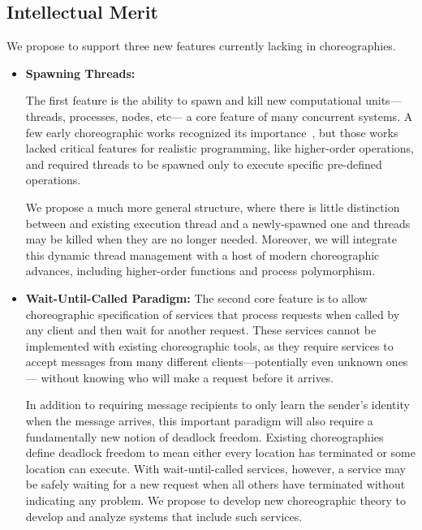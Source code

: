\subsection{Intellectual Merit}
We propose to support three new features currently lacking in choreographies.

\begin{itemize}[leftmargin=*]
\item \textbf{Spawning Threads:}

    The first feature is the ability to spawn and kill new computational units---threads, processes, nodes, etc---%
    a core feature of many concurrent systems.
    A few early choreographic works recognized its importance~\citep{CarboneM13,CruzFilipeM16a},
    but those works lacked critical features for realistic programming, like higher-order operations,
    and required threads to be spawned only to execute specific pre-defined operations.

    We propose a much more general structure, where there is little distinction between
    and existing execution thread and a newly-spawned one and threads may be killed when they are no longer needed.
    Moreover, we will integrate this dynamic thread management with a host of modern choreographic advances,
    including higher-order functions and process polymorphism.

  \item \textbf{Wait-Until-Called Paradigm:}
    The second core feature is to allow choreographic specification of services
    that process requests when called by any client and then wait for another request.
    These services cannot be implemented with existing choreographic tools,
    as they require services to accept messages from many different clients---potentially even unknown ones---%
    without knowing who will make a request before it arrives.

    In addition to requiring message recipients to only learn the sender's identity when the message arrives,
    this important paradigm will also require a fundamentally new notion of deadlock freedom.
    Existing choreographies define deadlock freedom to mean either every location has terminated or some location can execute.
    With wait-until-called services, however, a service may be safely waiting for a new request when all others have terminated without indicating any problem.
    We propose to develop new choreographic theory to develop and analyze systems that include such services.


\end{itemize}
